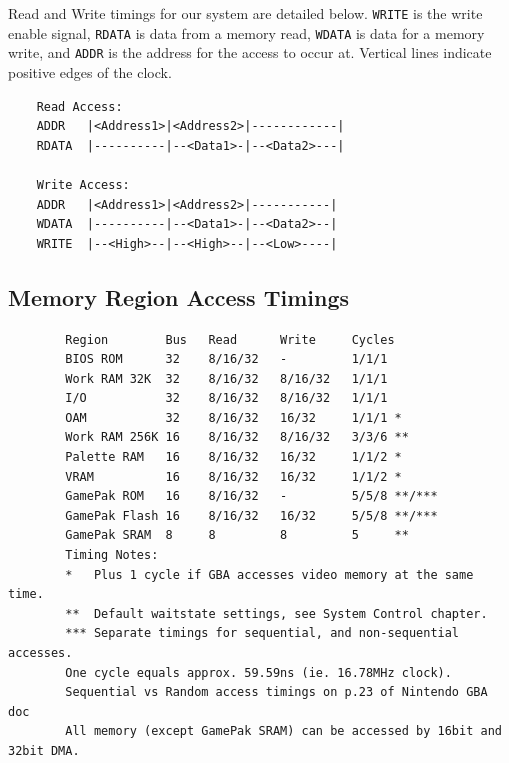 \documentclass[11pt,a4paper,draft]{article}
\begin{document}
	Read and Write timings for our system are detailed below. \texttt{WRITE} is the write enable signal, \texttt{RDATA} is data from a memory read, \texttt{WDATA} is data for a memory write, and \texttt{ADDR} is the address for the access to occur at. Vertical lines indicate positive edges of the clock.
	\begin{verbatim}
	Read Access:
	ADDR   |<Address1>|<Address2>|------------|
	RDATA  |----------|--<Data1>-|--<Data2>---|
	
	Write Access:
	ADDR   |<Address1>|<Address2>|-----------|
	WDATA  |----------|--<Data1>-|--<Data2>--|
	WRITE  |--<High>--|--<High>--|--<Low>----|
	\end{verbatim}
	
	\subsection{Memory Region Access Timings}
	\begin{verbatim}
	    Region        Bus   Read      Write     Cycles
	    BIOS ROM      32    8/16/32   -         1/1/1
	    Work RAM 32K  32    8/16/32   8/16/32   1/1/1
	    I/O           32    8/16/32   8/16/32   1/1/1
	    OAM           32    8/16/32   16/32     1/1/1 *
	    Work RAM 256K 16    8/16/32   8/16/32   3/3/6 **
	    Palette RAM   16    8/16/32   16/32     1/1/2 *
	    VRAM          16    8/16/32   16/32     1/1/2 *
	    GamePak ROM   16    8/16/32   -         5/5/8 **/***
	    GamePak Flash 16    8/16/32   16/32     5/5/8 **/***
	    GamePak SRAM  8     8         8         5     **
	    Timing Notes:
	    *   Plus 1 cycle if GBA accesses video memory at the same time.
	    **  Default waitstate settings, see System Control chapter.
	    *** Separate timings for sequential, and non-sequential accesses.
	    One cycle equals approx. 59.59ns (ie. 16.78MHz clock).
	    Sequential vs Random access timings on p.23 of Nintendo GBA doc
	    All memory (except GamePak SRAM) can be accessed by 16bit and 32bit DMA.
	    \end{verbatim} \cite{GBATek}
	
\end{document}
